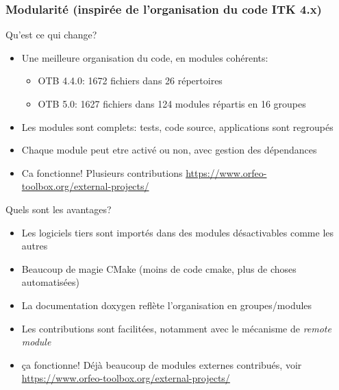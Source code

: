 \documentclass[8pt]{beamer}
\begin{document}
\begin{frame}
\frametitle{Modularité (inspirée de l'organisation du code ITK 4.x)}
\begin{block}{Qu'est ce qui change?}
\begin{itemize}
\item Une meilleure organisation du code, en modules cohérents:
  \begin{itemize}
    \item OTB 4.4.0: 1672 fichiers dans 26 répertoires
    \item OTB 5.0: 1627 fichiers dans 124 modules répartis en 16 groupes
  \end{itemize}
\item Les modules sont complets: tests, code source, applications sont regroupés
\item Chaque module peut etre activé ou non, avec gestion des dépendances
\item Ca fonctionne! Plusieurs contributions \url{https://www.orfeo-toolbox.org/external-projects/}

\end{itemize}
\end{block}

\begin{block}{Quels sont les avantages?}
\begin{itemize}
\item Les logiciels tiers sont importés dans des modules désactivables comme les autres
\item Beaucoup de magie CMake (moins de code cmake, plus de choses automatisées)
\item La documentation doxygen reflète l'organisation en groupes/modules
\item Les contributions sont facilitées, notamment avec le mécanisme de
  \textit{remote module}
\item ça fonctionne! Déjà beaucoup de modules externes contribués, voir \url{https://www.orfeo-toolbox.org/external-projects/}
\end{itemize}
\end{block}
\end{frame}
\end{document}
